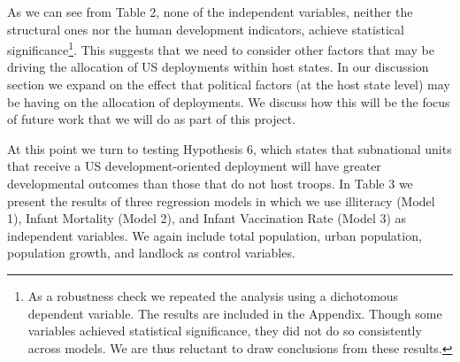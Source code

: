 \documentclass[12pt]{article}
\begin{document}
\begin{doublespace}
As we can see from Table 2, none of the independent variables, neither the structural ones nor the human development indicators, achieve statistical significance\footnote{As a robustness check we repeated the analysis using a dichotomous dependent variable.  The results are included in the Appendix. Though some variables achieved statistical significance, they did not do so consistently across models.  We are thus reluctant to draw conclusions from these results.}. This suggests that we need to consider other factors that may be driving the allocation of US deployments within host states.   In our discussion section we expand on the effect that political factors (at the host state level) may be having on the allocation of deployments.  We discuss how this will be the focus of future work that we will do as part of this project.  

At this point we turn to testing Hypothesis 6, which states that subnational units that receive a US development-oriented deployment will have greater developmental outcomes than those that do not host troops.  In Table 3 we present the results of three regression models in which we use illiteracy (Model 1), Infant Mortality (Model 2), and Infant Vaccination Rate (Model 3) as independent variables.  We again include total population, urban population, population growth, and landlock as control variables.  


\end{doublespace}
\end{document}
